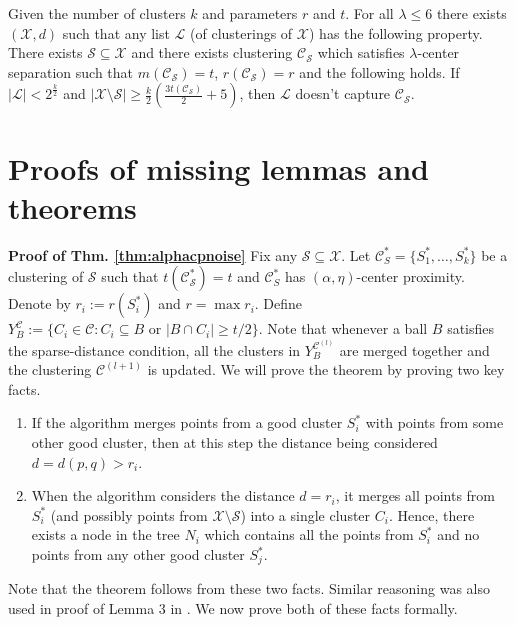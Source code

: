 \documentclass[orivec]{llncs}
\newcommand{\mc}{\mathcal}
\renewcommand\labelitemi{$\bullet$}
\begin{document}
\begin{theorem}
\label{thm:nosparselistlambdacs}
Given the number of clusters $k$ and parameters $r$ and $t$. For all $\lambda \le 6$ there exists $(\mc X, d)$ such that any list $\mc L$ (of clusterings of $\mc X$) has the following property. There exists $\mc S \subseteq \mc X$ and there exists clustering $\mc C_{\mc S}$ which satisfies $\lambda$-center separation such that $m(\mc C_{\mc S}) = t$, $r(\mc C_{\mc S}) = r$ and the following holds. If $|\mc L| < 2^{\frac{k}{2}}$ and $|\mc X \setminus \mc S|\ge \frac{k}{2}(\frac{3t(\mc C_{\mc S})}{2}+5)$, then $\mc L$ doesn't capture $\mc C_{\mc S}$.
\end{theorem}



 
\appendix

\section{Proofs of missing lemmas and theorems}
\textbf{Proof of Thm. \ref{thm:alphacpnoise}}
Fix any $\mc S \subseteq \mc X$. Let $\mc C^*_S = \{S_1^*, \ldots, S_k^*\}$ be a clustering of $\mc S$ such that $t(\mc C_{\mc S}^*) = t$ and $\mc C^*_S$ has $(\alpha, \eta)$-center proximity. Denote by $r_i := r(S_i^*)$ and $r = \max r_i$. Define $Y_B^{\mc C} := \{C_i \in \mc C : C_i \subseteq B \text{ or } |B \cap C_i| \ge t/2\}$. Note that whenever a ball $B$ satisfies the sparse-distance condition, all the clusters in $Y_{B}^{{\mc C}^{(l)}}$ are merged together and the clustering $\mc C^{(l+1)}$ is updated. We will prove the theorem by proving two key facts.

\begin{enumerate}[nolistsep, noitemsep, label=\textbf{F.\arabic*},leftmargin=0.3in]
\renewcommand\labelitemi{$\diamond$}
\item \label{fact:1} If the algorithm merges points from a good cluster $S_i^*$ with points from some other good cluster,  then at this step the distance being considered $d = d(p,q) > r_i$.	
\item \label{fact:2} When the algorithm considers the distance $d = r_i$, it merges all points from $S_i^*$ (and possibly points from $\mc X\setminus \mc S$) into a single cluster $C_i$. Hence, there exists a node in the tree $N_i$ which contains all the points from $S_i^*$ and no points from any other good cluster $S_j^*$. 	
\end{enumerate}
Note that the theorem follows from these two facts. Similar reasoning was also used in proof of Lemma 3 in \cite{balcan2012clustering}. We now prove both of these facts formally. 
\end{document}
